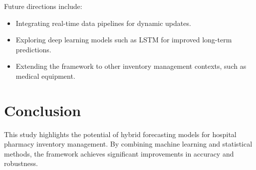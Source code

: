 \documentclass[conference]{IEEEtran}
\begin{document}
Future directions include:
\begin{itemize}
    \item Integrating real-time data pipelines for dynamic updates.
    \item Exploring deep learning models such as LSTM for improved long-term predictions.
    \item Extending the framework to other inventory management contexts, such as medical equipment.
\end{itemize}

\section{Conclusion}
This study highlights the potential of hybrid forecasting models for hospital pharmacy inventory management. By combining machine learning and statistical methods, the framework achieves significant improvements in accuracy and robustness.



\end{document}
